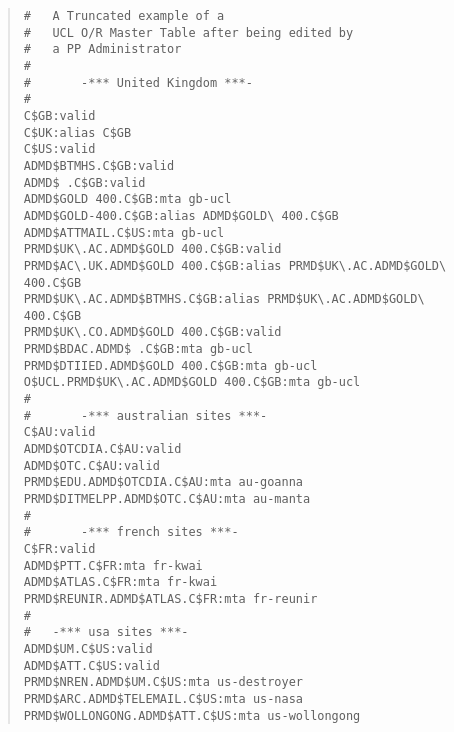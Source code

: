 \begin{quote}\footnotesize\begin{verbatim} 
#   A Truncated example of a 
#   UCL O/R Master Table after being edited by 
#   a PP Administrator
#
#       -*** United Kingdom ***-
#
C$GB:valid
C$UK:alias C$GB
C$US:valid
ADMD$BTMHS.C$GB:valid
ADMD$ .C$GB:valid
ADMD$GOLD 400.C$GB:mta gb-ucl
ADMD$GOLD-400.C$GB:alias ADMD$GOLD\ 400.C$GB
ADMD$ATTMAIL.C$US:mta gb-ucl
PRMD$UK\.AC.ADMD$GOLD 400.C$GB:valid
PRMD$AC\.UK.ADMD$GOLD 400.C$GB:alias PRMD$UK\.AC.ADMD$GOLD\ 400.C$GB
PRMD$UK\.AC.ADMD$BTMHS.C$GB:alias PRMD$UK\.AC.ADMD$GOLD\ 400.C$GB
PRMD$UK\.CO.ADMD$GOLD 400.C$GB:valid
PRMD$BDAC.ADMD$ .C$GB:mta gb-ucl
PRMD$DTIIED.ADMD$GOLD 400.C$GB:mta gb-ucl
O$UCL.PRMD$UK\.AC.ADMD$GOLD 400.C$GB:mta gb-ucl
#
#       -*** australian sites ***-
C$AU:valid
ADMD$OTCDIA.C$AU:valid
ADMD$OTC.C$AU:valid
PRMD$EDU.ADMD$OTCDIA.C$AU:mta au-goanna
PRMD$DITMELPP.ADMD$OTC.C$AU:mta au-manta
#
#       -*** french sites ***-
C$FR:valid
ADMD$PTT.C$FR:mta fr-kwai
ADMD$ATLAS.C$FR:mta fr-kwai 
PRMD$REUNIR.ADMD$ATLAS.C$FR:mta fr-reunir
#
#	-*** usa sites ***-
ADMD$UM.C$US:valid
ADMD$ATT.C$US:valid
PRMD$NREN.ADMD$UM.C$US:mta us-destroyer 
PRMD$ARC.ADMD$TELEMAIL.C$US:mta us-nasa
PRMD$WOLLONGONG.ADMD$ATT.C$US:mta us-wollongong
\end{verbatim}\end{quote}
